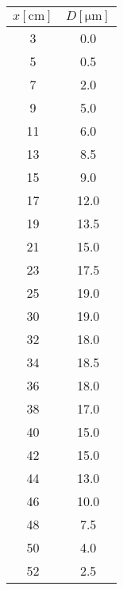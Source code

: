 \begin{table}
\begin{minipage}{0.48\linewidth}
        \begin{tabular}[h!]{|c|c|}
            \toprule
            {$x\left[\unit{\centi\meter}\right]$} & {$D\left[\unit{\micro\meter}\right]$}\\
            \midrule
            3& 0.0\\
            5& 0.5\\
            7& 2.0\\
            9& 5.0\\
            11& 6.0\\
            13& 8.5\\
            15& 9.0\\
            17& 12.0\\
            19& 13.5\\
            21& 15.0\\
            23& 17.5\\
            25& 19.0\\
            \hline
            30& 19.0\\
            32& 18.0\\
            34& 18.5\\
            36& 18.0\\
            38& 17.0\\
            40& 15.0\\
            42& 15.0\\
            44& 13.0\\
            46& 10.0\\
            48& 7.5\\
            50& 4.0\\
            52& 2.5\\
            \bottomrule
        \end{tabular}
    \end{minipage}
\end{table}

